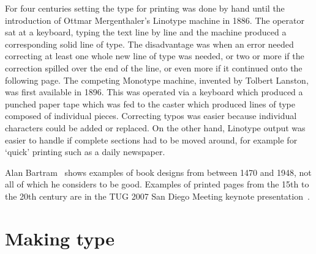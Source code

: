 \documentclass[10pt,a4paper,oneside,extrafontsizes]{memoir}%
\begin{document}
\begin{paracol}{2}
   For four centuries setting the type for printing was done by hand until 
the introduction of Ottmar Mergenthaler's 
Linotype machine in 1886. The operator
sat at a keyboard, typing the text line by line and the machine produced a 
corresponding solid line of type. The disadvantage was when an error needed
correcting at least one whole new line of type was needed, or two or more if
the correction spilled over the end of the line, or even more if it continued
onto the following page. The competing 
Monotype machine, invented by Tolbert 
Lanston, was first available in 1896. This was operated via a keyboard which
produced a punched paper tape which was fed to the caster which produced
lines of type composed of individual pieces. Correcting typos was easier
because individual characters could be added or replaced. On the other hand,
Linotype output was easier to handle if complete sections had to be moved
around, for example for `quick' printing such as a daily newspaper. 

    Alan Bartram~\autocite{BARTRAM01} shows examples of book designs from between
1470 and 1948, not all of which he considers to be good. Examples of printed
pages from the 15th to the 20th century are in the TUG 2007 San Diego Meeting
keynote presentation~\autocite{TUGKEYNOTE07}.
\end{paracol}

\section{Making type}
\end{document}
